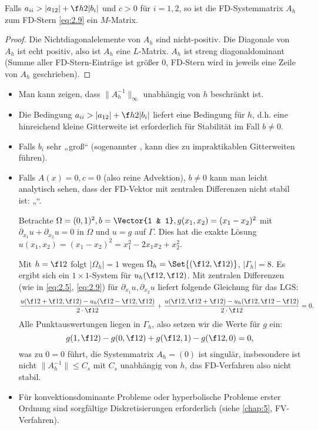 
\begin{kor} \label{2.31}
	Falls $a_{ii} > |a_{12}| + \f h2 |b_i|$ und $c > 0$ für $i= 1,2$, so ist die FD-Systemmatrix $A_h$ zum FD-Stern \eqref{eq:2.9} ein $M$-Matrix.
	\begin{proof}
		Die Nichtdiagonalelemente von $A_h$ sind nicht-positiv.
		Die Diagonale von $A_h$ ist echt positiv, also ist $A_h$ eine $L$-Matrix.
		$A_h$ ist streng diagonaldominant (Summe aller FD-Stern-Einträge ist größer 0, FD-Stern wird in jeweils eine Zeile von $A_h$ geschrieben).
	\end{proof}
	\begin{note}
		\begin{itemize}
			\item
				Man kann zeigen, dass $\|A_h^{-1}\|_\infty$ unabhängig von $h$ beschränkt ist.
			\item
				Die Bedingung $a_{ii} > |a_{12}| + \f h2 |b_i|$ liefert eine Bedingung für $h$, d.h. eine hinreichend kleine Gitterweite ist erforderlich für Stabilität im Fall $b \neq 0$.
			\item
				Falls $b_i$ sehr „groß“ (sogenannter , kann dies zu impraktikablen Gitterweiten führen).
			\item
				Falls $A(x) = 0, c = 0$ (also reine Advektion), $b \neq 0$ kann man leicht analytisch sehen, dass der FD-Vektor mit zentralen Differenzen nicht stabil ist: „“.

				Betrachte $\Omega = (0,1)^2, b = \Vector{1 & 1}, g(x_1, x_2) = (x_1 - x_2)^2$ mit $\partial_{x_1} u + \partial_{x_2} u = 0$ in $\Omega$ und $u = g$ auf $\Gamma$.
				Dies hat die exakte Lösung $u(x_1, x_2) = (x_1 - x_2)^2 = x_1^2 - 2x_1x_2 + x_2^2$.

				Mit $h = \f 12$ folgt $|\Omega_h| = 1$ wegen $\Omega_h = \Set{(\f 12, \f 12)}$, $|\Gamma_h| = 8$.
				Es ergibt sich ein $1\times 1$-System für $u_h(\f 12, \f 12)$.
				Mit zentralen Differenzen (wie in \eqref{eq:2.5}, \eqref{eq:2.9}) für $\partial_{x_1} u, \partial_{x_2} u$ liefert folgende Gleichung für das LGS:
				\[
					\dfrac{u(\f 12 + \f 12, \f 12) - u_h(\f 12 - \f 12, \f 12)}{2 \cdot \f 12}
					+ \dfrac{u(\f 12, \f 12 + \f 12) - u_h(\f 12, \f 12 - \f 12)}{2 \cdot \f 12}
					= 0.
				\]
				Alle Punktauswertungen liegen in $\Gamma_h$, also setzen wir die Werte für $g$ ein:
				\[
					g(1, \f 12) - g(0, \f 12) + g(\f 12, 1) - g(\f 12, 0) = 0,
				\]
				was zu $0 = 0$ führt, die Systemmatrix $A_h = (0)$ ist singulär, insbesondere ist nicht $\|A_h^{-1}\| \le C_s$ mit $C_s$ unabhängig von $h$, das FD-Verfahren also nicht stabil.
			\item
				Für konvektionsdominante Probleme oder hyperbolische Probleme erster Ordnung sind sorgfältige Diskretisierungen erforderlich (siehe \ref{chap:5}, FV-Verfahren).
		\end{itemize}
	\end{note}
\end{kor}

